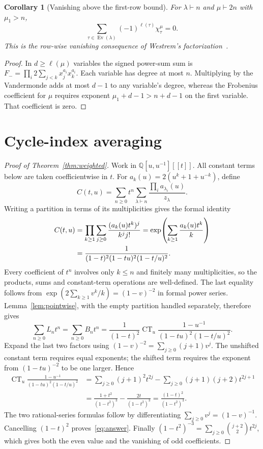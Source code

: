 \documentclass[11pt]{article}
\newcommand{\Ev}{\operatorname{Ev}}
\newcommand{\CT}{\operatorname{CT}}
\newtheorem{corollary}[theorem]{Corollary}
\begin{document}
\begin{corollary}[Vanishing above the first-row bound]\label{cor:row}
For $\lambda\vdash n$ and $\mu\vdash2n$ with $\mu_1>n$,
\[
 \sum_{\tau\in\Ev(\lambda)}(-1)^{\ell(\tau)}\chi^\mu_\tau=0.
\]
This is the row-wise vanishing consequence of Westrem's
factorization~\cite[Corollary 3.4]{W}.
\end{corollary}
\begin{proof}
In $d\geq\ell(\mu)$ variables the signed power-sum sum is
$F_-=\prod_i2\sum_{j<k}x_j^{a_i}x_k^{a_i}$.
Each variable has degree at most $n$. Multiplying by the Vandermonde
adds at most $d-1$ to any variable's degree, whereas the Frobenius
coefficient for $\mu$ requires exponent $\mu_1+d-1>n+d-1$
on the first variable. That coefficient is zero.
\end{proof}

\section{Cycle-index averaging}
\begin{proof}[Proof of Theorem~\ref{thm:weighted}]
Work in $\mathbb Q[u,u^{-1}][[t]]$.
All constant terms below are taken coefficientwise in $t$.
For $a_k(u)=2(u^k+1+u^{-k})$, define
\[
 C(t,u)=\sum_{n\geq0}t^n\sum_{\lambda\vdash n}
                  \frac{\prod_i a_{\lambda_i}(u)}{z_\lambda}.
\]
Writing a partition in terms of its multiplicities gives the formal identity
\begin{align}
 C(t,u)
 &=\prod_{k\geq1}\sum_{j\geq0}
       \frac{(a_k(u)t^k)^j}{k^j j!}
 =\exp\!\left(\sum_{k\geq1}\frac{a_k(u)t^k}{k}\right)\notag\\
 &=\frac{1}{(1-t)^2(1-tu)^2(1-t/u)^2}.\label{eq:cycle}
\end{align}
Every coefficient of $t^n$ involves only $k\leq n$ and finitely many
multiplicities, so the products, sums and constant-term operations are
well-defined. The last equality follows from
$\exp(2\sum_{k\geq1}v^k/k)=(1-v)^{-2}$ in formal power series.
Lemma~\ref{lem:pointwise}, with the empty partition handled separately,
therefore gives
\[
 \sum_{n\geq0}L_nt^n=\sum_{n\geq0}B_nt^n
 =\frac{1}{(1-t)^2}\CT_u
       \frac{1-u^{-1}}{(1-tu)^2(1-t/u)^2}.
\]
Expand the last two factors using
$(1-v)^{-2}=\sum_{j\geq0}(j+1)v^j$.
The unshifted constant term requires equal exponents; the shifted term
requires the exponent from $(1-tu)^{-2}$ to be one larger. Hence
\begin{align*}
 \CT_u\frac{1-u^{-1}}{(1-tu)^2(1-t/u)^2}
 &=\sum_{j\geq0}(j+1)^2t^{2j}
       -\sum_{j\geq0}(j+1)(j+2)t^{2j+1}\\
 &=\frac{1+t^2}{(1-t^2)^3}-\frac{2t}{(1-t^2)^3}
 =\frac{(1-t)^2}{(1-t^2)^3}.
\end{align*}
The two rational-series formulas follow by differentiating
$\sum_{j\geq0}v^j=(1-v)^{-1}$.
Cancelling $(1-t)^2$ proves~\eqref{eq:answer}.
Finally $(1-t^2)^{-3}=\sum_{j\geq0}\binom{j+2}{2}t^{2j}$,
which gives both the even value and the vanishing of odd coefficients.
\end{proof}
\end{document}
